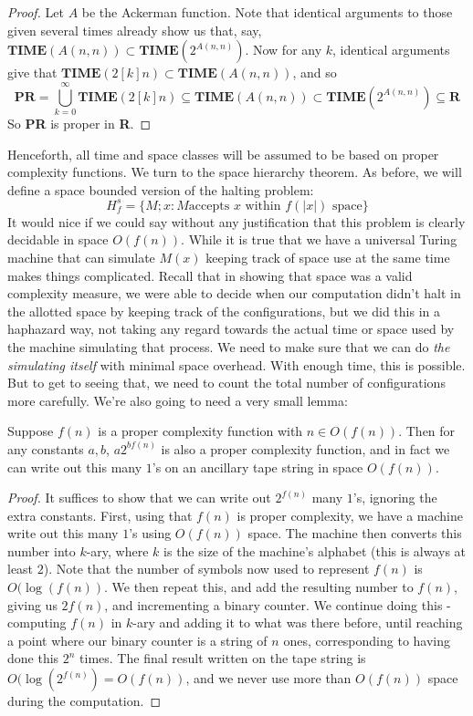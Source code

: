 \begin{proof}
	Let $A$ be the Ackerman function. Note that identical arguments to those given several times already show us that, say, $\textbf{TIME}(A(n,n)) \subset \textbf{TIME}(2^{A(n,n)})$. Now for any $k$, identical arguments give that $\textbf{TIME}(2[k]n) \subset \textbf{TIME}(A(n,n))$, and so
	\[\textbf{PR} = \bigcup_{k=0}^{\infty} \textbf{TIME}(2[k]n) \subseteq \textbf{TIME}(A(n,n)) \subset \textbf{TIME}(2^{A(n,n)}) \subseteq \textbf{R} \]
So \textbf{PR} is proper in \textbf{R}.
\end{proof}
Henceforth, all time and space classes will be assumed to be based on proper complexity functions. We turn to the space hierarchy theorem. As before, we will define a space bounded version of the halting problem: 
	\[ H^s_f = \{M;x : M \textrm{accepts $x$ within $f(|x|)$ space} \} \]
It would nice if we could say without any justification that this problem is clearly decidable in space $O(f(n))$. While it is true that we have a universal Turing machine that can simulate $M(x)$ keeping track of space use at the same time makes things complicated. Recall that in showing that space was a valid complexity measure, we were able to decide when our computation didn't halt in the allotted space by keeping track of the configurations, but we did this in a haphazard way, not taking any regard towards the actual time or space used by the machine simulating that process. We need to make sure that we can do \textit{the simulating itself} with minimal space overhead. With enough time, this is possible. But to get to seeing that, we need to count the total number of configurations more carefully. We're also going to need a very small lemma:
\begin{lemma}
	Suppose $f(n)$ is a proper complexity function with $n \in O(f(n))$. Then for any constants $a,b$, $a2^{bf(n)}$ is also a proper complexity function, and in fact we can write out this many $1$'s on an ancillary tape string in space $O(f(n))$.
\end{lemma}
\begin{proof}
	It suffices to show that we can write out $2^{f(n)}$ many $1$'s, ignoring the extra constants. First, using that $f(n)$ is proper complexity, we have a machine write out this many $1$'s using $O(f(n))$ space. The machine then converts this number into $k$-ary, where $k$ is the size of the machine's alphabet (this is always at least $2$). Note that the number of symbols now used to represent $f(n)$ is $O(\log(f(n))$. We then repeat this, and add the resulting number to $f(n)$, giving us $2f(n)$, and incrementing a binary counter. We continue doing this - computing $f(n)$ in $k$-ary and adding it to what was there before, until reaching a point where our binary counter is a string of $n$ ones, corresponding to having done this $2^n$ times. The final result written on the tape string is $O(\log(2^{f(n)}) = O(f(n))$, and we never use more than $O(f(n))$ space during the computation. 
\end{proof}
